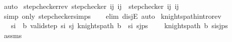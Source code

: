 \begin{isabellebody}
\ auto\isanewline
{}\isamarkupfalse%
%
\endisatagproof
{\isafoldproof}%
%
\isadelimproof
\isanewline
%
\endisadelimproof
\isanewline
{}\isamarkupfalse%
\ step{\isacharunderscore}{\kern0pt}checker{\isacharunderscore}{\kern0pt}rev{\isacharcolon}{\kern0pt}\ {\isachardoublequoteopen}step{\isacharunderscore}{\kern0pt}checker\ {\isacharparenleft}{\kern0pt}i{\isacharcomma}{\kern0pt}j{\isacharparenright}{\kern0pt}\ {\isacharparenleft}{\kern0pt}i{\isacharprime}{\kern0pt}{\isacharcomma}{\kern0pt}j{\isacharprime}{\kern0pt}{\isacharparenright}{\kern0pt}\ {\isasymLongrightarrow}\ step{\isacharunderscore}{\kern0pt}checker\ {\isacharparenleft}{\kern0pt}i{\isacharprime}{\kern0pt}{\isacharcomma}{\kern0pt}j{\isacharprime}{\kern0pt}{\isacharparenright}{\kern0pt}\ {\isacharparenleft}{\kern0pt}i{\isacharcomma}{\kern0pt}j{\isacharparenright}{\kern0pt}{\isachardoublequoteclose}\isanewline
%
\isadelimproof
\ \ %
\endisadelimproof
%
\isatagproof
{}\isamarkupfalse%
\ {\isacharparenleft}{\kern0pt}simp\ only{\isacharcolon}{\kern0pt}\ step{\isacharunderscore}{\kern0pt}checker{\isachardot}{\kern0pt}simps{\isacharparenright}{\kern0pt}\isanewline
\ \ \isamarkupfalse%
\ {\isacharparenleft}{\kern0pt}elim\ disjE{\isacharparenright}{\kern0pt}\ auto%
\endisatagproof
{\isafoldproof}%
%
\isadelimproof
\isanewline
%
\endisadelimproof
\isanewline
{}\isamarkupfalse%
\ knights{\isacharunderscore}{\kern0pt}path{\isacharunderscore}{\kern0pt}intro{\isacharunderscore}{\kern0pt}rev{\isacharcolon}{\kern0pt}\ \isanewline
\ \ \ {\isachardoublequoteopen}s\isactrlsub i\ {\isasymin}\ b{\isachardoublequoteclose}\ {\isachardoublequoteopen}valid{\isacharunderscore}{\kern0pt}step\ s\isactrlsub i\ s\isactrlsub j{\isachardoublequoteclose}\ {\isachardoublequoteopen}knights{\isacharunderscore}{\kern0pt}path\ {\isacharparenleft}{\kern0pt}b\ {\isacharminus}{\kern0pt}\ {\isacharbraceleft}{\kern0pt}s\isactrlsub i{\isacharbraceright}{\kern0pt}{\isacharparenright}{\kern0pt}\ {\isacharparenleft}{\kern0pt}s\isactrlsub j{\isacharhash}{\kern0pt}ps{\isacharparenright}{\kern0pt}{\isachardoublequoteclose}\ \isanewline
\ \ \ {\isachardoublequoteopen}knights{\isacharunderscore}{\kern0pt}path\ b\ {\isacharparenleft}{\kern0pt}s\isactrlsub i{\isacharhash}{\kern0pt}s\isactrlsub j{\isacharhash}{\kern0pt}ps{\isacharparenright}{\kern0pt}{\isachardoublequoteclose}\isanewline
%
\isadelimproof
\ \ %
\endisadelimproof
%
\isatagproof
{}\isamarkupfalse%
\ assms\isanewline
{}\isamarkupfalse%
\ {\isacharminus}{\kern0pt}\isanewline

\end{isabellebody}
